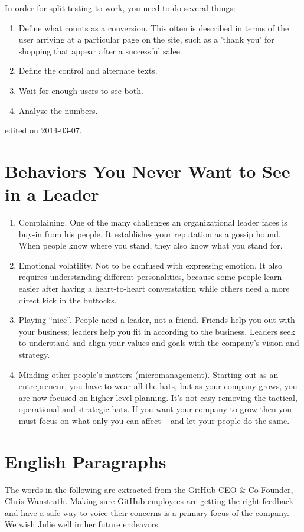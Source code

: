 In order for split testing to work, 
you need to do several things:
\begin{enumerate}
    \item Define what counts as a conversion.
        This often is described in terms of the user
        arriving at a particular page on the site, 
        such as a 'thank you' for shopping that appear
        after a successful salee.
    \item Define the control and alternate texts.
    \item Wait for enough users to see both.
    \item Analyze the numbers.
\end{enumerate}
\hfill {\tiny edited on 2014-03-07.}
\section{ Behaviors You Never Want to See in a Leader}
\begin{enumerate}
    \item Complaining. One of the many challenges an organizational leader faces is buy-in from his people. 
        It establishes your reputation as a gossip hound.
        When people know where you stand, they also know what you stand for.
    \item Emotional volatility. Not to be confused with expressing emotion. It also requires understanding different personalities, because some people learn easier after having a heart-to-heart converstation while others need a more direct kick in the buttocks.
    \item Playing ``nice''.  People need a leader, not a friend. Friends help you out with your business; leaders help you fit in according to the business. Leaders seek to understand and align your values and goals with the company's vision and strategy.
    \item Minding other people's matters (micromanagement). Starting out as an entrepreneur, you have to wear all the hats, but as your company grows, you are now focused on higher-level planning. It's not easy removing the tactical, operational and strategic hats. If you want your company to grow then you must focus on what only you can affect -- and let your people do the same.
\end{enumerate}

\section{English Paragraphs}
The words in the following are extracted from the GitHub CEO \& Co-Founder, Chris Wanstrath.
Making sure GitHub employees are getting the right feedback and have a safe way to voice their concerns is a primary focus of the company.
We wish Julie well in her future endeavors.

